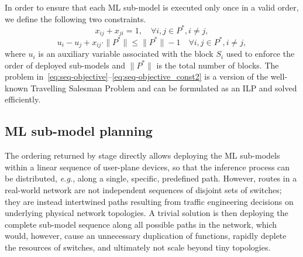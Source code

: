 \documentclass[journal]{IEEEtran}
\theoremstyle{plain} %
\newcommand{\eg}{\textit{e.g.},\xspace}
\newcommand{\da}[1]{\textcolor{blue}{[David: #1]}}
\newcommand*\numO[1]{\raisebox{.5pt}{\textcircled{\raisebox{-.9pt} {#1}}}}
\newcommand{\name}{\texttt{\fontsize{9}{11}\selectfont DUNE}\xspace}
\begin{document}
In order to ensure that each ML sub-model is executed only once in a valid order, we define the  following two constraints.
\begin{equation}
    x_{ij} + x_{ji} = 1, \quad \forall i,j \in P^*, i\neq j,
\label{eq:seq-objective_const1}
\end{equation}
\begin{equation}
    u_i - u_j + x_{ij} \cdot \|P^*\| \leq \|P^*\|-1 \quad \forall i,j \in P^*, i\neq j,
\label{eq:seq-objective_const2}
\end{equation}
where $u_i$ is an auxiliary variable associated with the block $S_i$ used to enforce the order of deployed sub-models and $\|P^*\|$ is the total number of blocks. The problem in~\eqref{eq:seq-objective}--\eqref{eq:seq-objective_const2} is a version of the well-known Travelling Salesman Problem and can be formulated as an ILP and solved efficiently.

\subsection{ML sub-model planning}
\label{sub:planner}


The ordering returned by stage \numO{5} directly allows deploying the ML sub-models within a linear sequence of user-plane devices, so that the inference process can be distributed, \eg along a single, specific, predefined path.
However, routes in a real-world network are not independent sequences of disjoint sets of switches; they are instead intertwined paths resulting from traffic engineering decisions on underlying physical network topologies. A trivial solution is then deploying the complete sub-model sequence along all possible paths in the network, which would, however, cause an unnecessary duplication of functions, rapidly deplete the resources of switches, and ultimately not scale beyond tiny topologies.
\end{document}
